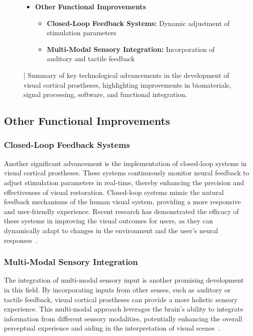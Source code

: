 \documentclass[twocolumn,10pt]{article}
\begin{document}
\begin{figure}[ht!]
\begin{tcolorbox}
\begin{itemize}
                  \item \textbf{Other Functional Improvements}
                        \begin{itemize}
                              \item \textbf{Closed-Loop Feedback Systems:} Dynamic adjustment of stimulation parameters
                              \item \textbf{Multi-Modal Sensory Integration:} Incorporation of auditory and tactile feedback
                        \end{itemize}
            \end{itemize}
      \end{tcolorbox}
      \caption{| Summary of key technological advancements in the development of
            visual cortical prostheses, highlighting improvements in biomaterials,
            signal processing, software, and functional
            integration.}\label{fig:advances_vcp}
\end{figure}

\subsection*{Other Functional Improvements}
\subsubsection*{Closed-Loop Feedback Systems}
Another significant advancement is the implementation of closed-loop systems in
visual cortical prostheses. These systems continuously monitor neural feedback
to adjust stimulation parameters in real-time, thereby enhancing the precision
and effectiveness of visual restoration. Closed-loop systems mimic the natural
feedback mechanisms of the human visual system, providing a more responsive and
user-friendly experience. Recent research has demonstrated the efficacy of these
systems in improving the visual outcomes for users, as they can dynamically
adapt to changes in the environment and the user's neural
responses~\parencite{leviEditorialClosedLoopSystems2018}.

\subsubsection*{Multi-Modal Sensory Integration}
The integration of multi-modal sensory input is another promising development in
this field. By incorporating inputs from other senses, such as auditory or
tactile feedback, visual cortical prostheses can provide a more holistic sensory
experience. This multi-modal approach leverages the brain's ability to integrate
information from different sensory modalities, potentially enhancing the overall
perceptual experience and aiding in the interpretation of visual
scenes~\parencite{wanArtificialSensoryNeuron2020}.
\end{document}
